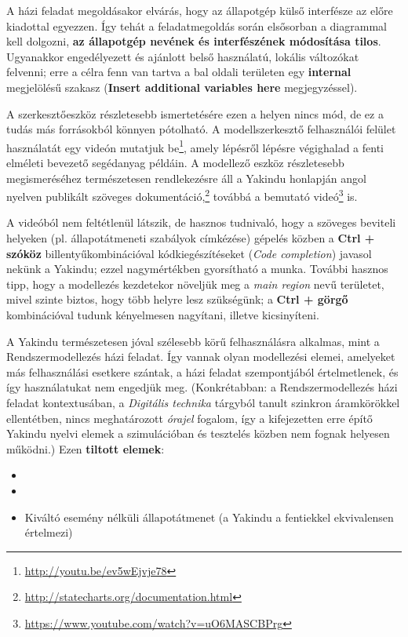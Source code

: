A házi feladat megoldásakor elvárás, hogy az állapotgép külső interfésze az előre kiadottal egyezzen. Így tehát a feladatmegoldás során elsősorban a diagrammal kell dolgozni, \textbf{az állapotgép nevének és interfészének módosítása tilos}. Ugyanakkor engedélyezett és ajánlott belső használatú, lokális változókat felvenni; erre a célra fenn van tartva a bal oldali területen egy \textbf{internal} megjelölésű szakasz (\textbf{Insert additional variables here} megjegyzéssel).

A szerkesztőeszköz részletesebb ismertetésére ezen a helyen nincs mód, de ez a tudás más forrásokból könnyen pótolható. A modellszerkesztő felhasználói felület használatát egy videón mutatjuk be\footnote{\url{ http://youtu.be/ev5wEjvje78}}, amely lépésről lépésre végighalad a fenti elméleti bevezető segédanyag példáin. A modellező eszköz részletesebb megismeréséhez természetesen rendlekezésre áll a Yakindu honlapján angol nyelven publikált szöveges dokumentáció,\footnote{\url{http://statecharts.org/documentation.html}} továbbá a bemutató videó\footnote{\url{https://www.youtube.com/watch?v=uO6MASCBPrg}} is.

A videóból nem feltétlenül látszik, de hasznos tudnivaló, hogy a szöveges beviteli helyeken (pl. állapotátmeneti szabályok címkézése) gépelés közben a \textbf{Ctrl + szóköz} billentyűkombinációval kódkiegészítéseket (\emph{Code completion}) javasol nekünk a Yakindu; ezzel nagymértékben gyorsítható a munka. További hasznos tipp, hogy a modellezés kezdetekor növeljük meg a \emph{main region} nevű területet, mivel szinte biztos, hogy több helyre lesz szükségünk; a \textbf{Ctrl + görgő} kombinációval tudunk kényelmesen nagyítani, illetve kicsinyíteni.

A Yakindu természetesen jóval szélesebb körű felhasználásra alkalmas, mint a Rendszermodellezés házi feladat. Így vannak olyan modellezési elemei, amelyeket más felhasználási esetkere szántak, a házi feladat szempontjából értelmetlenek, és így használatukat nem engedjük meg. (Konkrétabban: a Rendszermodellezés házi feladat kontextusában, a \emph{Digitális technika} tárgyból tanult szinkron áramkörökkel ellentétben, nincs meghatározott \emph{órajel} fogalom, így a kifejezetten erre építő Yakindu nyelvi elemek a szimulációban és tesztelés közben nem fognak helyesen működni.) Ezen \textbf{tiltott elemek}:

\begin{itemize}
	\item {}
	\item {}
	\item Kiváltó esemény nélküli állapotátmenet (a Yakindu a fentiekkel ekvivalensen értelmezi)
\end{itemize}

